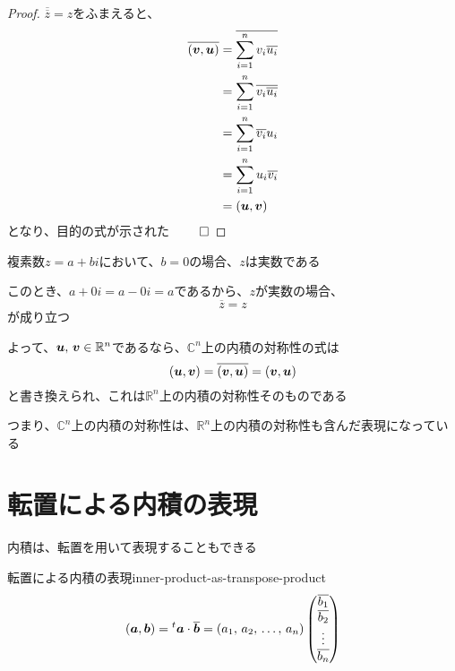 \documentclass[../../../topic_linear-algebra]{subfiles}
\begin{document}
\begin{proof}
  $\overline{\overline{z}} = z$をふまえると、
  \begin{align*}
    \overline{(\vb*{v}, \vb*{u})} & = \overline{\sum_{i=1}^n v_i \overline{u_i}} \\
                                  & = \sum_{i=1}^n \overline{v_i \overline{u_i}} \\
                                  & = \sum_{i=1}^n \overline{v_i} u_i            \\
                                  & = \sum_{i=1}^n u_i \overline{v_i}            \\
                                  & = (\vb*{u}, \vb*{v})
  \end{align*}
  となり、目的の式が示された $\qed$
\end{proof}

複素数$z=a+bi$において、$b=0$の場合、$z$は実数である

このとき、$a+0i = a-0i = a$であるから、$z$が実数の場合、
\begin{equation*}
  \overline{z} = z
\end{equation*}
が成り立つ

\br

よって、$\vb*{u},\,\vb*{v} \in \mathbb{R}^n$であるなら、$\mathbb{C}^n$上の内積の対称性の式は
\begin{equation*}
  (\vb*{u}, \vb*{v}) = \overline{(\vb*{v}, \vb*{u})} = (\vb*{v}, \vb*{u})
\end{equation*}
と書き換えられ、これは$\mathbb{R}^n$上の内積の対称性そのものである

\br

つまり、$\mathbb{C}^n$上の内積の対称性は、$\mathbb{R}^n$上の内積の対称性も含んだ表現になっている

\sectionline
\section{転置による内積の表現}

内積は、転置を用いて表現することもできる

\begin{theorem}{転置による内積の表現}{inner-product-as-transpose-product}
  \begin{equation*}
    (\vb*{a},\vb*{b}) = {}^t \vb*{a} \cdot \overline{\vb*{b}} = \left(a_1,\,a_2,\,\ldots,\,a_n\right) \begin{pmatrix}
      \overline{b_1} \\
      \overline{b_2} \\
      \vdots         \\
      \overline{b_n}
    \end{pmatrix}
  \end{equation*}
\end{theorem}
\end{document}
